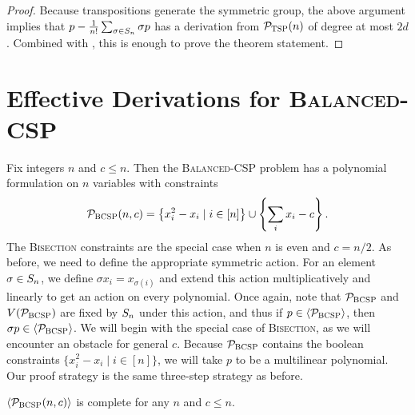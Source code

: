 \begin{proof}
Because transpositions generate the symmetric group, the above argument implies that $p - \frac{1}{n!}\sum_{\sigma \in S_{n}} \sigma p$ has a derivation from $\mathcal P_{\textsc{TSP}}(n)$ of degree at most $2d$. Combined with , this is enough to prove the theorem statement. 
\end{proof}

\section{Effective Derivations for \textsc{Balanced-CSP}}\label{sec:bcsp}
Fix integers $n$ and $c \leq n$. Then the \textsc{Balanced-CSP} problem has a polynomial formulation on $n$ variables with constraints
\begin{align}
\mathcal P_{\textsc{BCSP}}(n,c) = \left\{x_i^2 - x_i\mid i \in [n]\right\} \cup \left\{\sum_i x_i - c\right\}.\label{eq:bcsp-formulation}
\end{align}
The \textsc{Bisection} constraints are the special case when $n$ is even and $c = n/2$. 
As before, we need to define the appropriate symmetric action. For an element $\sigma \in S_{n}$, we define $\sigma x_i = x_{\sigma(i)}$ and extend this action multiplicatively and linearly to get an action on every polynomial. 
Once again, note that $\mathcal P_{\textsc{BCSP}}$ and $V(\mathcal P_{\textsc{BCSP}})$ are fixed by $S_{n}$ under this action, and thus if $p \in \langle \mathcal P_{\textsc{BCSP}} \rangle$, then $\sigma p \in \langle \mathcal P_{\textsc{BCSP}} \rangle$. 
We will begin with the special case of \textsc{Bisection}, as we will encounter an obstacle for general $c$. 
Because $\mathcal P_{\textsc{BCSP}}$ contains the boolean constraints $\{x_i^2 - x_i \mid i \in [n]\}$, we will take $p$ to be a multilinear polynomial. 
Our proof strategy is the same three-step strategy as before. 
\begin{lemma}\label{lem:bcsp-complete}
$\langle \mathcal P_{\textsc{BCSP}}(n,c) \rangle$ is complete for any $n$ and $c \leq n$.
\end{lemma}
